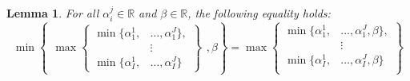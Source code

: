 \documentclass{article} %
\theoremstyle{style1}
\newtheorem{lemma}[theorem]{Lemma}
\theoremstyle{style1}
\theoremstyle{example}
\begin{document}
\begin{lemma}\label{lemma:minmax_dist}
For all $\alpha^j_i\in\mathbb{R}$ and $\beta\in\mathbb{R}$, the following equality holds:
\[
\min
\left\{
  \begin{aligned}
    \max\left\{
      \begin{aligned}
        \min\{\alpha_1^1,&\ldots,\alpha_1^J\}, \\
        &\vdots \\
        \min\{\alpha_I^1,&\ldots,\alpha_I^J\}
      \end{aligned}
    \right\}
  \end{aligned}
  , \beta
\right\}
=
\max\left\{
  \begin{aligned}
    \min\{\alpha_1^1,&\ldots,\alpha_1^J,\beta\}, \\
    &\vdots \\
    \min\{\alpha_I^1,&\ldots,\alpha_I^J,\beta\} \\
  \end{aligned}
\right\}
\]
\end{lemma}
\end{document}
